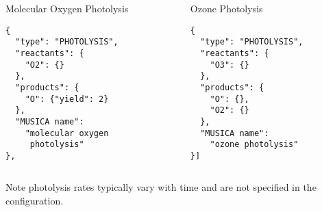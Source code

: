\begin{columns}
\begin{column}{0.47\textwidth}
\vspace{-0.25in}
\begin{block}{Molecular Oxygen Photolysis}
\begin{verbatim}
{
  "type": "PHOTOLYSIS",
  "reactants": {
    "O2": {}
  },
  "products": {
    "O": {"yield": 2}
  },
  "MUSICA name":
    "molecular oxygen
     photolysis"
},
\end{verbatim}
\end{block}
\end{column}
\begin{column}{0.47\textwidth}
\vspace{-0.25in}
\begin{block}{Ozone Photolysis}
\begin{verbatim}
{
  "type": "PHOTOLYSIS",
  "reactants": {
    "O3": {}
  },
  "products": {
    "O": {},
    "O2": {}
  },
  "MUSICA name":
    "ozone photolysis"
}]
\end{verbatim}
\end{block}
\end{column}
\end{columns}
\vspace{0.1in}
\small{Note photolysis rates typically vary with time and
are not specified in the configuration.}
